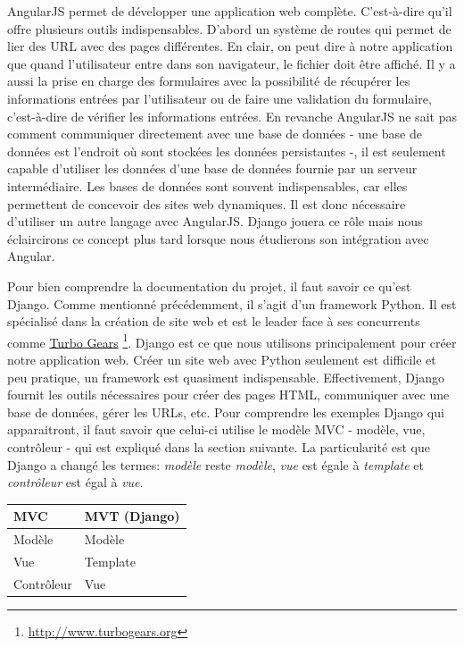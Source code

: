 \documentclass[letterpaper,10pt,oneside]{sphinxmanual}
\begin{document}
AngularJS permet de développer une application web complète. C'est-à-dire qu'il offre plusieurs outils indispensables. D'abord un système de routes qui permet de lier des URL avec des pages différentes. En clair, on peut dire à notre application que quand l'utilisateur entre  dans son navigateur, le fichier  doit être affiché. Il y a aussi la prise en charge des formulaires avec la possibilité de récupérer les informations entrées par l'utilisateur ou de faire une validation du formulaire, c'est-à-dire de vérifier les informations entrées. En revanche AngularJS ne sait pas comment communiquer directement avec une base de données - une base de données est l'endroit où sont stockées les données persistantes -, il est seulement capable d'utiliser les données d'une base de données fournie par un serveur intermédiaire. Les bases de données sont souvent indispensables, car elles permettent de concevoir des sites web dynamiques. Il est donc nécessaire d'utiliser un autre langage avec AngularJS. Django jouera ce rôle mais nous éclaircirons ce concept plus tard lorsque nous étudierons son intégration avec Angular.

Pour bien comprendre la documentation du projet, il faut savoir ce qu'est Django. Comme mentionné précédemment, il s'agit d'un framework Python. Il est spécialisé dans la création de site web et est le leader face à ses concurrents comme \href{http://www.turbogears.org/}{Turbo Gears} \footnote{
\href{http://www.turbogears.org}{http://www.turbogears.org}
}. Django est ce que nous utilisons principalement pour créer notre application web. Créer un site web avec Python seulement est difficile et peu pratique, un framework est  quasiment indispensable. Effectivement, Django fournit les outils nécessaires pour créer des pages HTML, communiquer avec une base de données, gérer les URLs, etc. Pour comprendre les exemples Django qui apparaitront, il faut savoir que celui-ci utilise le modèle MVC - modèle, vue, contrôleur - qui est expliqué dans la section suivante. La particularité est que Django a changé les termes: \emph{modèle} reste \emph{modèle}, \emph{vue} est égale à \emph{template} et \emph{contrôleur} est égal à \emph{vue}.

\begin{tabulary}{\linewidth}{|L|L|}
\hline
\textsf{\relax 
MVC
} & \textsf{\relax 
MVT (Django)
}\\
\hline
Modèle
 & 
Modèle
\\

Vue
 & 
Template
\\

Contrôleur
 & 
Vue
\\
\hline\end{tabulary}
\end{document}
